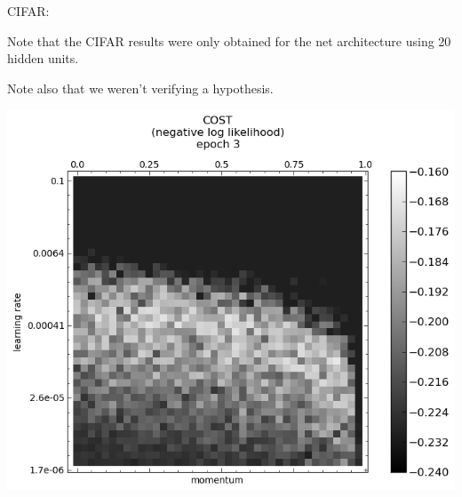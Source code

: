 \documentclass[10pt]{article}
\begin{document}
CIFAR:

Note that the CIFAR results were only obtained for the net
architecture using 20 hidden units.

Note also that we weren't verifying a hypothesis.

\includegraphics[scale=0.5]{plots/detailed/LF-20R10R-20T10-CIFAR-3.png}
\end{document}
